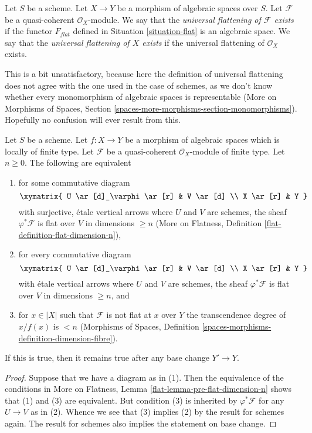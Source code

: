 \begin{definition}
\label{definition-flattening}
Let $S$ be a scheme.
Let $X \to Y$ be a morphism of algebraic spaces over $S$.
Let $\mathcal{F}$ be a quasi-coherent $\mathcal{O}_X$-module.
We say that the {\it universal flattening of $\mathcal{F}$ exists}
if the functor $F_{flat}$ defined in Situation \ref{situation-flat}
is an algebraic space.
We say that the {\it universal flattening of $X$ exists}
if the universal flattening of $\mathcal{O}_X$ exists.
\end{definition}

\noindent
This is a bit unsatisfactory, because here the definition of
universal flattening does not agree with the one used in the
case of schemes, as we don't know whether every monomorphism of
algebraic spaces is representable (More on Morphisms of Spaces,
Section \ref{spaces-more-morphisms-section-monomorphisms}).
Hopefully no confusion will ever result from this.

\begin{lemma}
\label{lemma-pre-flat-dimension-n}
Let $S$ be a scheme.
Let $f : X \to Y$ be a morphism of algebraic spaces which is
locally of finite type.
Let $\mathcal{F}$ be a quasi-coherent $\mathcal{O}_X$-module of finite
type. Let $n \geq 0$. The following are equivalent
\begin{enumerate}
\item for some commutative diagram
$$
\xymatrix{
U \ar[d]_\varphi \ar[r] & V \ar[d] \\
X \ar[r] & Y
}
$$
with surjective, \'etale vertical arrows where $U$ and $V$ are
schemes, the sheaf $\varphi^*\mathcal{F}$ is flat over $V$
in dimensions $\geq n$ (More on Flatness, Definition
\ref{flat-definition-flat-dimension-n}),
\item for every commutative diagram
$$
\xymatrix{
U \ar[d]_\varphi \ar[r] & V \ar[d] \\
X \ar[r] & Y
}
$$
with \'etale vertical arrows where $U$ and $V$ are schemes,
the sheaf $\varphi^*\mathcal{F}$ is flat over $V$ in dimensions $\geq n$, and
\item for $x \in |X|$ such that $\mathcal{F}$ is not flat at $x$
over $Y$ the transcendence degree of $x/f(x)$ is $< n$ (Morphisms of Spaces,
Definition \ref{spaces-morphisms-definition-dimension-fibre}).
\end{enumerate}
If this is true, then it remains true after any base change $Y' \to Y$.
\end{lemma}

\begin{proof}
Suppose that we have a diagram as in (1). Then the equivalence of
the conditions in More on Flatness, Lemma \ref{flat-lemma-pre-flat-dimension-n}
shows that (1) and (3) are equivalent. But condition (3) is inherited
by $\varphi^*\mathcal{F}$ for any $U \to V$ as in (2).
Whence we see that (3) implies (2) by the result for schemes again.
The result for schemes also implies the statement on base change.
\end{proof}

